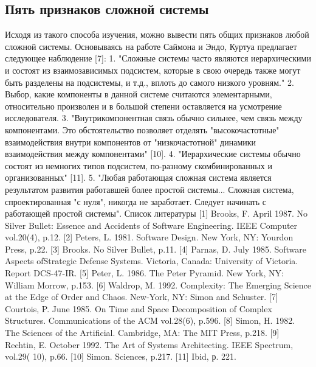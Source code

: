 \documentclass[11pt]{article}
\begin{document}
\subsection{Пять признаков сложной системы}
Исходя из такого способа изучения, можно вывести пять общих признаков любой сложной системы. Основываясь на работе Саймона и Эндо, Куртуа предлагает следующее наблюдение [7]: 
1. "Сложные системы часто являются иерархическими и состоят из взаимозависимых подсистем, которые в свою очередь также могут быть разделены на подсистемы, и т.д., вплоть до самого низкого уровням." 
2. Выбор, какие компоненты в данной системе считаются элементарными, относительно произволен и в большой степени оставляется на усмотрение исследователя. 
3. "Внутрикомпонентная связь обычно сильнее, чем связь между компонентами. Это обстоятельство позволяет отделять "высокочастотные" взаимодействия внутри компонентов от "низкочастотной" динамики взаимодействия между компонентами" [10]. 
4. "Иерархические системы обычно состоят из немногих типов подсистем, по-разному скомбинированных и организованных" [11]. 
5. "Любая работающая сложная система является результатом развития работавшей более простой системы... Сложная система, спроектированная "с нуля", никогда не заработает. Следует начинать с работающей простой системы". 
Список литературы
[1] Brooks, F. April 1987. No Silver Bullet: Essence and Accidents of Software Engineering. IEEE Computer vol.20(4), p.12. 
[2] Peters, L. 1981. Software Design. New York, NY: Yourdon Press, p.22. 
[3] Brooks. No Silver Bullet, p.11. 
[4] Parnas, D. July 1985. Software Aspects ofStrategic Defense Systems. Victoria, Canada: University of Victoria. Report DCS-47-IR. 
[5] Peter, L. 1986. The Peter Pyramid. New York, NY: William Morrow, p.153. 
[6] Waldrop, M. 1992. Complexity: The Emerging Science at the Edge of Order and Chaos. New-York, NY: Simon and Schuster. 
[7] Courtois, P. June 1985. On Time and Space Decomposition of Complex Structures. Communications of the ACM vol.28(6), p.596. 
[8] Simon, H. 1982. The Sciences of the Artificial. Cambridge, MA: The MIT Press, p.218. 
[9] Rechtin, E. October 1992. The Art of Systems Architecting. IEEE Spectrum, vol.29( 10), p.66. 
[10] Simon. Sciences, p.217. 
[11] Ibid, р. 221. 
\end{document}
